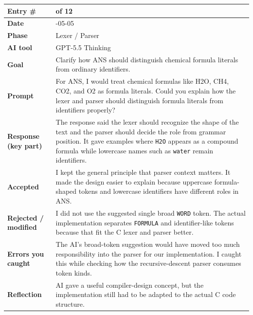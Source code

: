 \documentclass[11pt,a4paper]{article}
\newcommand{\code}[1]{\texttt{#1}}
\newcommand{\entrygap}{\vspace{8pt}}
\newenvironment{journalentry}{%
  \begin{center}\small\renewcommand{\arraystretch}{1.22}%
  \begin{tabular}{|>{\columncolor{anscodebg}\bfseries}p{3.0cm}|>{\RaggedRight\arraybackslash}p{12.25cm}|}%
  \hline
}{%
  \end{tabular}\end{center}\entrygap
}
\begin{document}
\begin{journalentry}
Entry \# & 3 of 12 \\ \hline
Date & 2026-05-05 \\ \hline
Phase & Lexer / Parser \\ \hline
AI tool & GPT-5.5 Thinking \\ \hline
Goal & Clarify how ANS should distinguish chemical formula literals from ordinary identifiers. \\ \hline
Prompt & For ANS, I would treat chemical formulas like H2O, CH4, CO2, and O2 as formula literals. Could you explain how the lexer and parser should distinguish formula literals from identifiers properly? \\ \hline
Response (key part) & The response said the lexer should recognize the shape of the text and the parser should decide the role from grammar position. It gave examples where \code{H2O} appears as a compound formula while lowercase names such as \code{water} remain identifiers. \\ \hline
Accepted & I kept the general principle that parser context matters. It made the design easier to explain because uppercase formula-shaped tokens and lowercase identifiers have different roles in ANS. \\ \hline
Rejected / modified & I did not use the suggested single broad \code{WORD} token. The actual implementation separates \code{FORMULA} and identifier-like tokens because that fit the C lexer and parser better. \\ \hline
Errors you caught & The AI's broad-token suggestion would have moved too much responsibility into the parser for our implementation. I caught this while checking how the recursive-descent parser consumes token kinds. \\ \hline
Reflection & AI gave a useful compiler-design concept, but the implementation still had to be adapted to the actual C code structure. \\ \hline
\end{journalentry}
\end{document}
